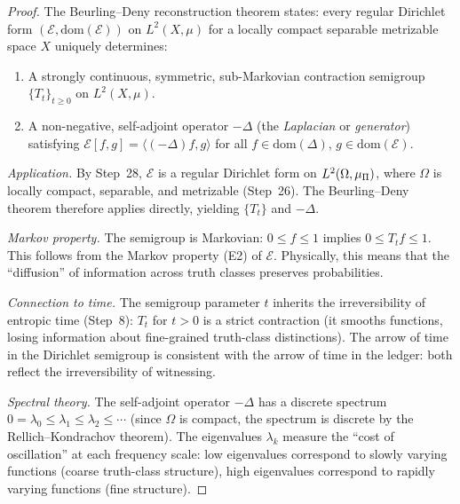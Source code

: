 \begin{proof}
The Beurling--Deny reconstruction theorem \citep{beurling1959} states:
every regular Dirichlet form $(\mathcal{E}, \mathrm{dom}(\mathcal{E}))$
on $L^2(X, \mu)$ for a locally compact separable metrizable space $X$
uniquely determines:
\begin{enumerate}[nosep]
  \item A strongly continuous, symmetric, sub-Markovian contraction
        semigroup $\{T_t\}_{t \geq 0}$ on $L^2(X, \mu)$.
  \item A non-negative, self-adjoint operator $-\Delta$ (the
        \emph{Laplacian} or \emph{generator}) satisfying
        $\mathcal{E}[f, g] = \langle (-\Delta) f, g \rangle$ for all
        $f \in \mathrm{dom}(\Delta)$, $g \in \mathrm{dom}(\mathcal{E})$.
\end{enumerate}

\emph{Application.}  By Step~28, $\mathcal{E}$ is a regular Dirichlet
form on $L^2(\Omega, \mu_\Pi)$, where $\Omega$ is locally compact,
separable, and metrizable (Step~26).  The Beurling--Deny theorem
therefore applies directly, yielding $\{T_t\}$ and $-\Delta$.

\emph{Markov property.}  The semigroup is Markovian:
$0 \leq f \leq 1$ implies $0 \leq T_t f \leq 1$.  This follows from
the Markov property (E2) of $\mathcal{E}$.  Physically, this means that
the ``diffusion'' of information across truth classes preserves
probabilities.

\emph{Connection to time.}  The semigroup parameter $t$ inherits the
irreversibility of entropic time (Step~8): $T_t$ for $t > 0$ is a
strict contraction (it smooths functions, losing information about
fine-grained truth-class distinctions).  The arrow of time in the
Dirichlet semigroup is consistent with the arrow of time in the ledger:
both reflect the irreversibility of witnessing.

\emph{Spectral theory.}  The self-adjoint operator $-\Delta$ has a
discrete spectrum $0 = \lambda_0 \leq \lambda_1 \leq \lambda_2 \leq \cdots$
(since $\Omega$ is compact, the spectrum is discrete by the Rellich--Kondrachov
theorem).  The eigenvalues $\lambda_k$ measure the ``cost of oscillation''
at each frequency scale: low eigenvalues correspond to slowly varying
functions (coarse truth-class structure), high eigenvalues correspond to
rapidly varying functions (fine structure).

\end{proof}

